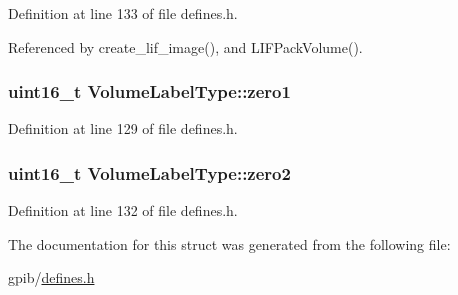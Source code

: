Definition at line 133 of file defines.\+h.



Referenced by create\+\_\+lif\+\_\+image(), and L\+I\+F\+Pack\+Volume().

\subsubsection[{\texorpdfstring{zero1}{zero1}}]{\setlength{\rightskip}{0pt plus 5cm}uint16\+\_\+t Volume\+Label\+Type\+::zero1}\hypertarget{structVolumeLabelType_a741f3741367c9c73ba24d15ac0b0e3a4}{}\label{structVolumeLabelType_a741f3741367c9c73ba24d15ac0b0e3a4}


Definition at line 129 of file defines.\+h.

\subsubsection[{\texorpdfstring{zero2}{zero2}}]{\setlength{\rightskip}{0pt plus 5cm}uint16\+\_\+t Volume\+Label\+Type\+::zero2}\hypertarget{structVolumeLabelType_a18c623a319ca760c0ad57ff96346e54f}{}\label{structVolumeLabelType_a18c623a319ca760c0ad57ff96346e54f}


Definition at line 132 of file defines.\+h.



The documentation for this struct was generated from the following file\+:\begin{DoxyCompactItemize}
\item 
gpib/\hyperlink{defines_8h}{defines.\+h}\end{DoxyCompactItemize}
